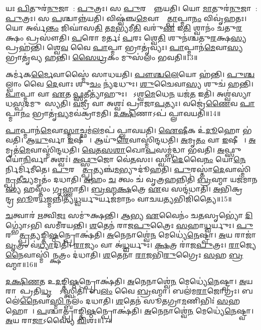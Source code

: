 𑌯𑌃 \ul{𑌪𑌿}𑌤𑍁𑌰॑\ul{𑌨𑍁}𑌜𑌾𑌯𑌾᳚: \ul{𑌪𑍁}𑌤𑍍𑌰𑌃।
𑌸 \ul{𑌪𑍁}𑌰𑌸𑍍𑌤𑌾᳚𑌨𑍍𑌨𑌯𑌤𑌿।
𑌯𑍋 \ul{𑌮𑌾}𑌤𑍁𑌰॑\ul{𑌨𑍁}𑌜𑌾𑌯𑌾᳚: \ul{𑌪𑍁}𑌤𑍍𑌰𑌃।
𑌸 \ul{𑌪}𑌶𑍍𑌚𑌾𑌨𑍍𑌨॑𑌯𑌤𑌿।
𑌵𑌿𑌷𑍍𑌵॑𑌞𑍍𑌚\ul{𑌮𑍇}𑌵𑌾𑌸𑍍𑌮𑌾᳚\ul{𑌤𑍍𑌪𑌾}𑌪𑍍𑌮𑌾\ul{𑌨𑌂} 𑌵𑌿𑌵𑍃॑𑌹𑌤𑌃।
𑌯𑍋 𑌅𑌰𑍍𑌵॑\ul{𑌨𑍍𑌤𑌂} 𑌜𑌿𑌘𑌾॑𑌸\ul{𑌤𑌿} 𑌤\ul{𑌮}𑌭𑍍𑌯॑𑌮𑍀\ul{𑌤𑌿} 𑌵𑌰𑍁॑\ul{𑌣} 𑌇\ul{𑌤𑌿} 𑌶𑍍𑌵𑌾𑌨𑌂॑ 𑌚𑌤𑍁\ul{𑌰}𑌕𑍍𑌷𑌂 𑌪𑍍𑌰𑌸𑍗॑𑌤𑌿।
\ul{𑌪}𑌰𑍋 𑌮𑌰𑍍𑌤𑌃॑ \ul{𑌪}𑌰𑌃 𑌶𑍍𑌵𑍇\ul{𑌤𑌿} 𑌶𑍁𑌨॑𑌶𑍍𑌚𑌤𑍁\ul{𑌰}𑌕𑍍𑌷\ul{𑌸𑍍𑌯} 𑌪𑍍𑌰𑌹॑𑌨𑍍𑌤𑌿।
𑌶𑍍𑌵𑍇\ul{𑌵} 𑌵𑍈 \ul{𑌪𑌾}𑌪𑍍𑌮𑌾 𑌭𑍍𑌰𑌾𑌤𑍃॑𑌵𑍍𑌯𑌃।
\ul{𑌪𑌾}𑌪𑍍𑌮𑌾𑌨॑\ul{𑌮𑍇}𑌵𑌾\ul{𑌸𑍍𑌯} 𑌭𑍍𑌰𑌾𑌤𑍃॑𑌵𑍍𑌯 𑌹𑌨𑍍𑌤𑌿।
\ul{𑌸𑍈}\ul{𑌧𑍍𑌰}𑌕𑌂 𑌮𑍁𑌸॑𑌲𑌂 𑌭𑌵𑌤𑌿॥13॥

𑌕𑌰𑍍𑌮॑𑌕\ul{𑌰𑍍𑌮𑍈}𑌵𑌾𑌸𑍍𑌮𑍈॑ 𑌸𑌾𑌧𑌯𑌤𑌿।
\ul{𑌪𑍗}\ul{}\ul{𑌶𑍍𑌚}\ul{𑌲𑍇}𑌯𑍋 𑌹॑𑌨𑍍𑌤𑌿।
\ul{𑌪𑍁}\ul{}\ul{𑌶𑍍𑌚}𑌲𑍍𑌵𑌾𑌂 𑌵𑍈 \ul{𑌦𑍇}𑌵𑌾𑌃 𑌶𑍁\ul{𑌚𑌂} 𑌨𑍍𑌯॑𑌦𑌧𑍁𑌃।
\ul{𑌶𑍁}𑌚𑍈𑌵𑌾\ul{𑌸𑍍𑌯} 𑌶𑍁𑌚॑ 𑌹𑌨𑍍𑌤𑌿।
\ul{𑌪𑌾}𑌪𑍍𑌮𑌾 𑌵𑌾 \ul{𑌏}𑌤𑌮𑍀᳚\ul{𑌫𑍍𑌸}𑌤𑍀𑌤𑍍𑌯𑌾॑𑌹𑍁𑌃।
𑌯𑍋᳚𑌽𑌶𑍍𑌵\ul{𑌮𑍇}𑌧𑍇\ul{𑌨} 𑌯𑌜॑\ul{𑌤} 𑌇𑌤𑌿॑।
𑌅𑌶𑍍𑌵॑𑌸𑍍𑌯𑌾𑌧\ul{𑌸𑍍𑌪}𑌦𑌮𑍁𑌪𑌾᳚𑌸𑍍𑌯𑌤𑌿।
\ul{𑌵}𑌜𑍍𑌰𑍀 𑌵𑌾 𑌅𑌶𑍍𑌵𑌃॑ 𑌪𑍍𑌰𑌾𑌜𑌾\ul{𑌪}𑌤𑍍𑌯𑌃।
𑌵𑌜𑍍𑌰𑍇॑\ul{𑌣𑍈}𑌵 \ul{𑌪𑌾}𑌪𑍍𑌮𑌾\ul{𑌨𑌂} 𑌭𑍍𑌰𑌾𑌤𑍃॑\ul{𑌵𑍍𑌯}𑌮𑌵॑\-𑌕𑍍𑌰𑌾𑌮𑌤𑌿।
\ul{𑌦}\ul{𑌕𑍍𑌷𑌿}𑌣𑌾𑌽𑌪॑ 𑌪𑍍𑌲𑌾𑌵𑌯𑌤𑌿॥14॥

\ul{𑌪𑌾}𑌪𑍍𑌮𑌾𑌨॑\ul{𑌮𑍇}𑌵𑌾\ul{𑌸𑍍𑌮𑌾}𑌚𑍍𑌛𑌮॑\ul{𑌲}𑌮𑌪॑ 𑌪𑍍𑌲𑌾𑌵𑌯𑌤𑌿।
\ul{𑌐}\ul{𑌷𑍀}𑌕 𑌉॑\ul{𑌦𑍂}𑌹𑍋 𑌭॑𑌵𑌤𑌿।
𑌆\ul{𑌯𑍁}𑌰𑍍𑌵𑌾 \ul{𑌇}𑌷𑍀𑌕𑌾𑌃᳚।
𑌆𑌯𑍁॑\ul{𑌰𑍇}𑌵𑌾𑌸𑍍𑌮𑌿॑𑌨𑍍𑌦𑌧𑌤𑌿।
\ul{𑌅}𑌮𑍃\ul{𑌤𑌂} 𑌵𑌾 \ul{𑌇}𑌷𑍀𑌕𑌾𑌃᳚।
\ul{𑌅}𑌮𑍃𑌤॑\ul{𑌮𑍇}𑌵𑌾𑌸𑍍𑌮𑌿॑𑌨𑍍𑌦𑌧𑌤𑌿।
\ul{𑌵𑍇}\ul{𑌤}\ul{𑌸}\ul{𑌶𑌾}𑌖𑍋\ul{𑌪}𑌸𑌮𑍍𑌬॑𑌦𑍍𑌧𑌾 𑌭𑌵𑌤𑌿।
\ul{𑌅}𑌫𑍍𑌸𑍁𑌯𑍋॑\ul{𑌨𑌿}𑌰𑍍𑌵𑌾 𑌅𑌶𑍍𑌵𑌃॑।
\ul{𑌅}\ul{𑌫𑍍𑌸𑍁}𑌜𑍋 𑌵𑍇॑\ul{𑌤}𑌸𑌃।
𑌸𑍍𑌵𑌾\ul{𑌦𑍇}𑌵𑍈\ul{𑌨𑌂} 𑌯𑍋\ul{𑌨𑍇}𑌰𑍍𑌨𑌿𑌰𑍍𑌮𑌿॑𑌮𑍀𑌤𑍇।
\ul{𑌪𑍁}𑌰𑌸𑍍𑌤𑌾᳚\ul{𑌤𑍍𑌪𑍍𑌰}𑌤𑍍𑌯𑌞𑍍𑌚॑\ul{𑌮}𑌭𑍍𑌯𑍁𑌦𑍂॑𑌹𑌤𑌿।
\ul{𑌪𑍁}𑌰𑌸𑍍𑌤𑌾॑\ul{𑌦𑍇}𑌵𑌾𑌸𑍍𑌮𑌿॑\ul{𑌨𑍍𑌪𑍍𑌰}𑌤𑍀\ul{𑌚𑍍𑌯}𑌮𑍃𑌤𑌂॑ 𑌦𑌧𑌾𑌤𑌿।
\ul{𑌅}𑌹𑌂 \ul{𑌚} 𑌤𑍍𑌵𑌂 𑌚॑ 𑌵𑍃𑌤𑍍𑌰\ul{𑌹}𑌨𑍍𑌨𑌿𑌤𑌿॑ \ul{𑌬𑍍𑌰}𑌹𑍍𑌮𑌾 𑌯𑌜॑𑌮𑌾𑌨\ul{𑌸𑍍𑌯} 𑌹𑌸𑍍𑌤𑌂॑ 𑌗𑍃𑌹𑍍𑌣𑌾𑌤𑌿।
\ul{𑌬𑍍𑌰}\ul{𑌹𑍍𑌮}\ul{𑌕𑍍𑌷}𑌤𑍍𑌰𑍇 \ul{𑌏}𑌵 𑌸𑌨𑍍𑌦॑𑌧𑌾𑌤𑌿।
\ul{𑌅}𑌭𑌿𑌕𑍍𑌰𑌤𑍍𑌵𑍇᳚𑌨𑍍𑌦𑍍𑌰 \ul{𑌭𑍂}𑌰\ul{𑌧}𑌜𑍍𑌮𑌨𑍍𑌨𑌿𑌤𑍍𑌯॑\ul{𑌧𑍍𑌵}𑌰𑍍𑌯𑍁𑌰𑍍𑌯𑌜॑𑌮𑌾𑌨𑌂 𑌵𑌾𑌚𑌯\ul{𑌤𑍍𑌯}𑌭𑌿𑌜𑌿॑𑌤𑍍𑌯𑍈॥15॥\anuvakamend[\ul{𑌭}\ul{𑌵}\ul{𑌤𑌿} \ul{𑌪𑍍𑌲𑌾}\ul{𑌵}\ul{𑌯}\ul{𑌤𑌿} \ul{𑌮𑌿}\ul{𑌮𑍀}\ul{𑌤𑍇} 𑌪𑌞𑍍𑌚॑ 𑌚]

\ul{𑌚}𑌤𑍍𑌵𑌾𑌰॑ \ul{𑌋}𑌤𑍍𑌵𑌿\ul{𑌜𑌃} 𑌸𑌮𑍁॑𑌕𑍍𑌷𑌨𑍍𑌤𑌿।
\ul{𑌆}𑌭𑍍𑌯 \ul{𑌏}𑌵𑍈𑌨𑌂॑ 𑌚\ul{𑌤}𑌸𑍃𑌭𑍍𑌯𑍋॑ \ul{𑌦𑌿}𑌗𑍍𑌭𑍍𑌯𑍋॑𑌽𑌭𑌿 𑌸𑌮𑍀॑𑌰𑌯𑌨𑍍𑌤𑌿।
\ul{𑌶}𑌤𑍇𑌨॑ 𑌰𑌾𑌜\ul{𑌪𑍁}𑌤𑍍𑌰𑍈𑌃 \ul{𑌸}𑌹𑌾\ul{𑌧𑍍𑌵}𑌰𑍍𑌯𑍁𑌃।
\ul{𑌪𑍁}𑌰𑌸𑍍𑌤𑌾᳚\ul{𑌤𑍍𑌪𑍍𑌰}𑌤𑍍𑌯𑌙𑍍𑌤𑌿\ul{𑌷𑍍𑌠}𑌨𑍍𑌪𑍍𑌰𑍋𑌕𑍍𑌷॑𑌤𑌿।
\ul{𑌅}𑌨𑍇𑌨𑌾𑌶𑍍𑌵𑍇॑\ul{𑌨} 𑌮𑍇𑌧𑍍𑌯𑍇॑\ul{𑌨𑍇}𑌷𑍍𑌟𑍍𑌵𑌾।
\ul{𑌅}𑌯 𑌰𑌾𑌜𑌾॑ \ul{𑌵𑍃}𑌤𑍍𑌰𑌂 𑌵॑\ul{𑌧𑍍𑌯𑌾}𑌦𑌿𑌤𑌿॑।
\ul{𑌰𑌾}𑌜𑍍𑌯𑌂 𑌵𑌾 𑌅॑\ul{𑌧𑍍𑌵}𑌰𑍍𑌯𑍁𑌃।
\ul{𑌕𑍍𑌷}𑌤𑍍𑌰 𑌰𑌾॑𑌜\ul{𑌪𑍁}𑌤𑍍𑌰𑌃।
\ul{𑌰𑌾}𑌜𑍍𑌯𑍇\ul{𑌨𑍈}𑌵𑌾𑌸𑍍𑌮𑌿॑\ul{𑌨𑍍𑌕𑍍𑌷}𑌤𑍍𑌰𑌂 𑌦॑𑌧𑌾𑌤𑌿।
\ul{𑌶}𑌤𑍇𑌨𑌾॑ \ul{𑌰𑌾}𑌜𑌭𑌿॑\ul{𑌰𑍁}𑌗𑍍𑌰𑍈𑌃 \ul{𑌸}𑌹 \ul{𑌬𑍍𑌰}𑌹𑍍𑌮𑌾॥16॥

\ul{𑌦}\ul{𑌕𑍍𑌷𑌿}\ul{𑌣}𑌤 𑌉\ul{𑌦}𑌙𑍍𑌤𑌿\ul{𑌷𑍍𑌠}𑌨𑍍𑌪𑍍𑌰𑍋𑌕𑍍𑌷॑𑌤𑌿।
\ul{𑌅}𑌨𑍇𑌨𑌾𑌶𑍍𑌵𑍇॑\ul{𑌨} 𑌮𑍇𑌧𑍍𑌯𑍇॑\ul{𑌨𑍇}𑌷𑍍𑌟𑍍𑌵𑌾।
\ul{𑌅}𑌯 𑌰𑌾𑌜𑌾᳚𑌪𑍍𑌰𑌤𑌿\ul{𑌧𑍃}𑌷𑍍𑌯𑍋᳚\-𑌽𑌸𑍍𑌤𑍍𑌵𑌿𑌤𑌿॑।
𑌬\ul{𑌲𑌂} 𑌵𑍈 \ul{𑌬𑍍𑌰}𑌹𑍍𑌮𑌾।
𑌬𑌲॑𑌮\ul{𑌰𑌾}𑌜𑍋𑌗𑍍𑌰𑌃।
𑌬𑌲𑍇॑\ul{𑌨𑍈}𑌵𑌾\ul{𑌸𑍍𑌮𑌿}𑌨𑍍𑌬𑌲𑌂॑ 𑌦𑌧𑌾𑌤𑌿।
\ul{𑌶}𑌤𑍇𑌨॑ 𑌸𑍂𑌤𑌗𑍍𑌰𑌾\ul{𑌮}𑌣𑌿𑌭𑌿𑌃॑ \ul{𑌸}𑌹 𑌹𑍋𑌤𑌾᳚।
\ul{𑌪}𑌶𑍍𑌚𑌾𑌤𑍍𑌪𑍍𑌰𑌾𑌙𑍍𑌤𑌿\ul{𑌷𑍍𑌠}𑌨𑍍𑌪𑍍𑌰𑍋𑌕𑍍𑌷॑𑌤𑌿।
\ul{𑌅}𑌨𑍇𑌨𑌾𑌶𑍍𑌵𑍇॑\ul{𑌨} 𑌮𑍇𑌧𑍍𑌯𑍇॑\ul{𑌨𑍇}𑌷𑍍𑌟𑍍𑌵𑌾।
\ul{𑌅}𑌯 𑌰𑌾\ul{𑌜𑌾}\-𑌽𑌸𑍍𑌯𑍈 \ul{𑌵𑌿}𑌶𑌃॥17॥

